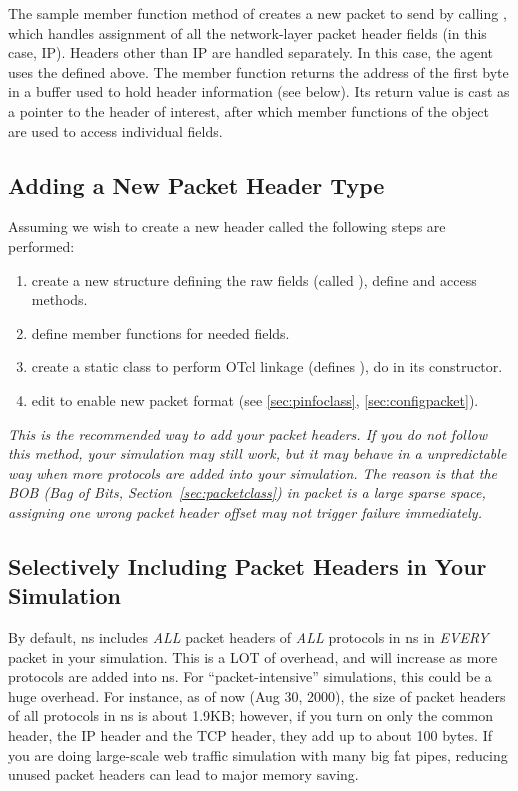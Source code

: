 The sample member function  method
of  creates a new packet
to send by calling , which handles assignment
of all the network-layer packet header fields (in this case, IP).
Headers other than IP are handled separately.
In this case, the agent uses the  defined above.
The  member function returns the address
of the first byte in a buffer used to hold header information (see below).
Its return value is cast as a pointer to the header of interest,
after which member functions of the 
object are used to access individual fields.

\subsection{Adding a New Packet Header Type}

Assuming we wish to create a new header called 
the following steps are performed:
\begin{enumerate}\itemsep0pt
  \item create a new structure defining the raw fields
        (called ), define  and access
        methods. 
  \item define member functions for needed fields.
  \item create a static class to perform OTcl linkage
        (defines ), do 
        in its constructor. 
  \item edit  to enable new packet format
        (see \ref{sec:pinfoclass}, \ref{sec:configpacket}).
\end{enumerate}

{\em This is the recommended way to add your packet headers. 
  If you do
  not follow this method, your simulation may still work, but it may 
  behave in a unpredictable way when more protocols are added into
  your simulation. 
  The reason is that the BOB (Bag of Bits,
  Section~\ref{sec:packetclass}) in \ns packet is a large
  sparse space, assigning one wrong packet header offset may not
  trigger failure immediately.}

\subsection{Selectively Including Packet Headers in Your Simulation}

By default, ns includes {\em ALL} packet headers of {\em ALL}
protocols in ns in {\em EVERY} packet in your simulation. 
This is a LOT of overhead, and will increase as more
protocols are added into ns.
For ``packet-intensive'' simulations, this could be a huge overhead.
For instance, as of now (Aug 30, 2000), the size of packet headers of
all protocols in ns is about 1.9KB; however, if you turn on only the
common header, the IP header and the TCP header, they add up to about
100 bytes. 
If you are doing large-scale web traffic simulation with many big fat
pipes, reducing unused packet headers can lead to major memory
saving.

